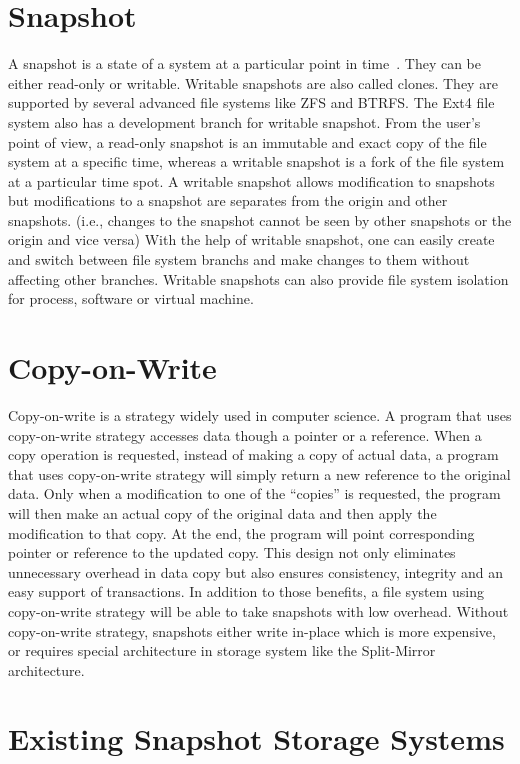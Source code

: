 \section{Snapshot}

    A snapshot is a state of a system at a particular point in time~\cite{btrfscow}. They can be either read-only or writable. Writable snapshots are also called clones. They are supported by several advanced file systems like ZFS and BTRFS. The Ext4 file system also has a development branch for writable snapshot. From the user’s point of view, a read-only snapshot is an immutable and exact copy of the file system at a specific time, whereas a writable snapshot is a fork of the file system at a particular time spot. A writable snapshot allows modification to snapshots but modifications to a snapshot are separates from the origin and other snapshots. (i.e., changes to the snapshot cannot be seen by other snapshots or the origin and vice versa) With the help of writable snapshot, one can easily create and switch between file system branchs and make changes to them without affecting other branches. Writable snapshots can also provide file system isolation for process, software or virtual machine.

\section{Copy-on-Write}

    Copy-on-write is a strategy widely used in computer science. A program that uses copy-on-write strategy accesses data though a pointer or a reference. When a copy operation is requested, instead of making a copy of actual data, a program that uses copy-on-write strategy will simply return a new reference to the original data. Only when a modification to one of the ``copies'' is requested, the program will then make an actual copy of the original data and then apply the modification to that copy. At the end, the program will point corresponding pointer or reference to the updated copy. This design not only eliminates unnecessary overhead in data copy but also ensures consistency, integrity and an easy support of transactions. In addition to those benefits, a file system using copy-on-write strategy will be able to take snapshots with low overhead. Without copy-on-write strategy, snapshots either write in-place which is more expensive, or requires special architecture in storage system like the Split-Mirror architecture.

\section{Existing Snapshot Storage Systems}

